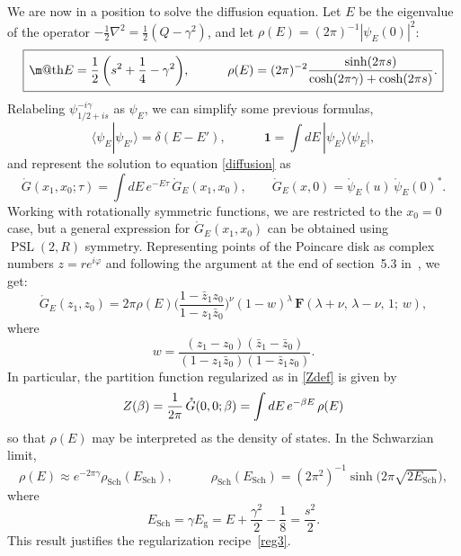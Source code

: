 \documentclass[12pt]{article}
\makeatletter
\newcommand*{\wideboxed}[1]{\setlength{\fboxsep}{1ex}%
  \fbox{\m@th$\displaystyle#1$}}
\newcommand{\hgfs}{\mathbf{F}}
\newcommand{\lt}{\left}
\newcommand{\rt}{\right}
\newcommand*{\bra}[1]{\langle{#1}|}
\newcommand*{\ket}[1]{|{#1}\rangle}
\newcommand*{\braket}[2]{\langle{#1}|{#2}\rangle}
\newcommand{\vp}{\varphi}
\newcommand{\RR}{\mathbb{R}}
\DeclareMathOperator{\PSL}{PSL}
\DeclareMathOperator{\Sch}{Sch}
\newcommand{\g}{\text{g}}
\newcommand{\unit}{\mathbf{1}}
\newcommand{\rpsi}{\mathring{\psi}}
\newcommand{\rG}{\mathring{G}}
\newcommand{\ov}{\over}
\def\RR{R}
\makeatother
\begin{document}
We are now in a position to solve the diffusion equation. Let $E$ be the eigenvalue of the operator $-\frac{1}{2}\nabla^2=\frac{1}{2}(Q-\gamma^2)$, and
let $\rho(E)=(2\pi)^{-1}|\psi_E(0)|^2$:
\begin{equation} \label{E&rho}
\wideboxed{
E=\frac{1}{2}\,\biggl(s^2+\frac{1}{4}-\gamma^2\biggr),\qquad\quad
\rho(E)=(2\pi)^{-2}\frac{\sinh(2\pi s)}{\cosh(2\pi\gamma)+\cosh(2\pi s)}.
}
\end{equation}
Relabeling $\psi^{-i\gamma}_{1/2+is}$ as $\psi_{E}$, we can simplify some previous formulas,
\begin{equation}
\braket{\psi_{E}}{\psi_{E'}}=\delta(E-E'),\qquad\quad
\unit=\int dE\, \ket{\psi_{E}}\bra{\psi_{E}},
\end{equation}
and represent the solution to equation \eqref{diffusion} as
\begin{equation} \label{Eucprop}
\rG(x_1,x_0;\tau)=\int dE\,e^{-E\tau}\,\rG_{E}(x_1,x_0),\qquad
\rG_{E}(x,0)=\rpsi_{E}(u)\,\rpsi_{E}(0)^{*}.
\end{equation}
Working with rotationally symmetric functions, we are restricted to the $x_0=0$ case, but a general expression for $\rG_{E}(x_1,x_0)$ can be obtained using $\PSL(2,\RR)$ symmetry. Representing points of the Poincare disk as complex numbers $z=re^{i\vp}$ and following the argument at the end of section~5.3 in~\cite{SL2R}, we get:
\begin{equation}
\rG_{E}(z_1,z_0)=2\pi\rho(E)
\biggl(\frac{1-\bar{z}_1z_0}{1-z_1\bar{z}_0}\biggr)^{\nu}(1-w)^{\lambda}\,
\hgfs(\lambda+\nu,\,\lambda-\nu,\,1;\,w),
\end{equation}
where
\begin{equation}
w=\frac{(z_1-z_0)(\bar{z}_1-\bar{z}_0)}{(1-z_1\bar{z}_0)(1-\bar{z}_1z_0)}.
\end{equation}
In particular, the partition function regularized as in \eqref{Zdef} is given by
\begin{equation} \label{Zbeta}
Z(\beta)={1 \ov 2 \pi}\,\rG(0,0;\beta)=\int dE\, e^{-\beta E}\,\rho(E)
\end{equation}
so that $\rho(E)$ may be interpreted as the density of states. In the Schwarzian limit,
\begin{equation}\label{rho_rhoSch}
\rho(E)\approx e^{-2\pi\gamma}\rho_{\Sch}(E_{\Sch}),\qquad\quad
\rho_{\Sch}(E_{\Sch})=\lt(2\pi^2\rt)^{-1}\sinh\biggl(2\pi\sqrt{2E_{\Sch}}\biggr),
\end{equation}
where
\begin{equation} \label{Egsrel}
E_{\Sch} = \gamma E_{\g} = E+\frac{\gamma^2}{2}-\frac{1}{8} =\frac{s^2}{2}.
\end{equation}
This result justifies the regularization recipe~\ref{reg3}.
\end{document}
